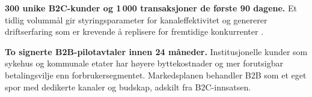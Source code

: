 \documentclass[12pt, a4paper]{article}
\begin{document}
\textbf{300 unike B2C-kunder og 1\,000 transaksjoner de første 90 dagene.}
Et tidlig volummål gir styringsparameter for kanaleffektivitet og
genererer driftserfaring som er krevende å replisere for fremtidige
konkurrenter \parencite[14]{porter1985}.

\textbf{To signerte B2B-pilotavtaler innen 24 måneder.}
Institusjonelle kunder som sykehus og kommunale etater har høyere
byttekostnader og mer forutsigbar betalingsvilje enn forbrukersegmentet.
Markedsplanen behandler B2B som et eget spor med dedikerte kanaler og
budskap, adskilt fra B2C-innsatsen.

\printbibliography[title={Referanseliste}]
\end{document}
